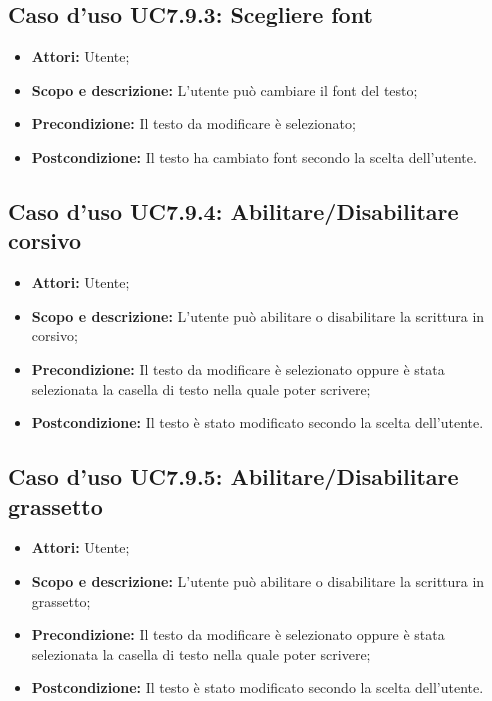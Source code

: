\subsection{Caso d'uso UC7.9.3: Scegliere font}
\begin{itemize}
	\item \textbf{Attori:} Utente;
	\item \textbf{Scopo e descrizione:} L'utente può cambiare il \gls{font} del testo;
	\item \textbf{Precondizione:} Il testo da modificare è selezionato;
	\item \textbf{Postcondizione:} Il testo ha cambiato \gls{font} secondo la scelta dell'utente.
\end{itemize}

\subsection{Caso d'uso UC7.9.4: Abilitare/Disabilitare corsivo}
\begin{itemize}
	\item \textbf{Attori:} Utente;
	\item \textbf{Scopo e descrizione:} L'utente può abilitare o disabilitare la scrittura in corsivo;
	\item \textbf{Precondizione:} Il testo da modificare è selezionato oppure è stata selezionata la casella di testo nella quale poter scrivere;
	\item \textbf{Postcondizione:} Il testo è stato modificato secondo la scelta dell'utente.
\end{itemize}

\subsection{Caso d'uso UC7.9.5: Abilitare/Disabilitare grassetto}
\begin{itemize}
	\item \textbf{Attori:} Utente;
	\item \textbf{Scopo e descrizione:} L'utente può abilitare o disabilitare la scrittura in grassetto;
	\item \textbf{Precondizione:} Il testo da modificare è selezionato oppure è stata selezionata la casella di testo nella quale poter scrivere;
	\item \textbf{Postcondizione:} Il testo è stato modificato secondo la scelta dell'utente.
\end{itemize}

